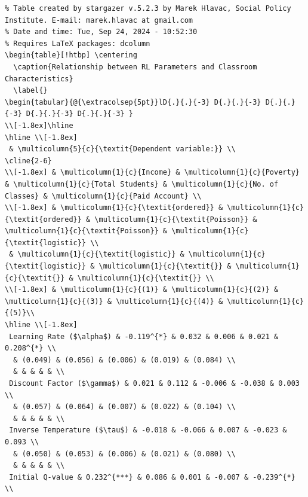 \documentclass[
  number,
  preprint,
  3p,
  onecolumn]{elsarticle}
\begin{document}
\begin{table}
{\begin{verbatim}
% Table created by stargazer v.5.2.3 by Marek Hlavac, Social Policy Institute. E-mail: marek.hlavac at gmail.com
% Date and time: Tue, Sep 24, 2024 - 10:52:30
% Requires LaTeX packages: dcolumn 
\begin{table}[!htbp] \centering 
  \caption{Relationship between RL Parameters and Classroom Characteristics} 
  \label{} 
\begin{tabular}{@{\extracolsep{5pt}}lD{.}{.}{-3} D{.}{.}{-3} D{.}{.}{-3} D{.}{.}{-3} D{.}{.}{-3} } 
\\[-1.8ex]\hline 
\hline \\[-1.8ex] 
 & \multicolumn{5}{c}{\textit{Dependent variable:}} \\ 
\cline{2-6} 
\\[-1.8ex] & \multicolumn{1}{c}{Income} & \multicolumn{1}{c}{Poverty} & \multicolumn{1}{c}{Total Students} & \multicolumn{1}{c}{No. of Classes} & \multicolumn{1}{c}{Paid Account} \\ 
\\[-1.8ex] & \multicolumn{1}{c}{\textit{ordered}} & \multicolumn{1}{c}{\textit{ordered}} & \multicolumn{1}{c}{\textit{Poisson}} & \multicolumn{1}{c}{\textit{Poisson}} & \multicolumn{1}{c}{\textit{logistic}} \\ 
 & \multicolumn{1}{c}{\textit{logistic}} & \multicolumn{1}{c}{\textit{logistic}} & \multicolumn{1}{c}{\textit{}} & \multicolumn{1}{c}{\textit{}} & \multicolumn{1}{c}{\textit{}} \\ 
\\[-1.8ex] & \multicolumn{1}{c}{(1)} & \multicolumn{1}{c}{(2)} & \multicolumn{1}{c}{(3)} & \multicolumn{1}{c}{(4)} & \multicolumn{1}{c}{(5)}\\ 
\hline \\[-1.8ex] 
 Learning Rate ($\alpha$) & -0.119^{*} & 0.032 & 0.006 & 0.021 & 0.208^{*} \\ 
  & (0.049) & (0.056) & (0.006) & (0.019) & (0.084) \\ 
  & & & & & \\ 
 Discount Factor ($\gamma$) & 0.021 & 0.112 & -0.006 & -0.038 & 0.003 \\ 
  & (0.057) & (0.064) & (0.007) & (0.022) & (0.104) \\ 
  & & & & & \\ 
 Inverse Temperature ($\tau$) & -0.018 & -0.066 & 0.007 & -0.023 & 0.093 \\ 
  & (0.050) & (0.053) & (0.006) & (0.021) & (0.080) \\ 
  & & & & & \\ 
 Initial Q-value & 0.232^{***} & 0.086 & 0.001 & -0.007 & -0.239^{*} \\ 

\end{verbatim}}
\end{table}
\end{document}
